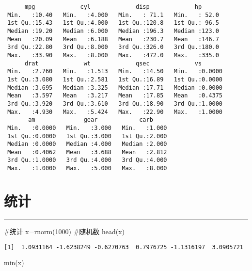 \documentclass[
  letterpaper,
  DIV=11,
  numbers=noendperiod]{scrreprt}
\newenvironment{Shaded}{\begin{snugshade}}{\end{snugshade}}
\newcommand{\CommentTok}[1]{\textcolor[rgb]{0.37,0.37,0.37}{#1}}
\newcommand{\DecValTok}[1]{\textcolor[rgb]{0.68,0.00,0.00}{#1}}
\newcommand{\FunctionTok}[1]{\textcolor[rgb]{0.28,0.35,0.67}{#1}}
\newcommand{\NormalTok}[1]{\textcolor[rgb]{0.00,0.23,0.31}{#1}}
\newcommand{\OtherTok}[1]{\textcolor[rgb]{0.00,0.23,0.31}{#1}}
\begin{document}
\begin{verbatim}
      mpg             cyl             disp             hp       
 Min.   :10.40   Min.   :4.000   Min.   : 71.1   Min.   : 52.0  
 1st Qu.:15.43   1st Qu.:4.000   1st Qu.:120.8   1st Qu.: 96.5  
 Median :19.20   Median :6.000   Median :196.3   Median :123.0  
 Mean   :20.09   Mean   :6.188   Mean   :230.7   Mean   :146.7  
 3rd Qu.:22.80   3rd Qu.:8.000   3rd Qu.:326.0   3rd Qu.:180.0  
 Max.   :33.90   Max.   :8.000   Max.   :472.0   Max.   :335.0  
      drat             wt             qsec             vs        
 Min.   :2.760   Min.   :1.513   Min.   :14.50   Min.   :0.0000  
 1st Qu.:3.080   1st Qu.:2.581   1st Qu.:16.89   1st Qu.:0.0000  
 Median :3.695   Median :3.325   Median :17.71   Median :0.0000  
 Mean   :3.597   Mean   :3.217   Mean   :17.85   Mean   :0.4375  
 3rd Qu.:3.920   3rd Qu.:3.610   3rd Qu.:18.90   3rd Qu.:1.0000  
 Max.   :4.930   Max.   :5.424   Max.   :22.90   Max.   :1.0000  
       am              gear            carb      
 Min.   :0.0000   Min.   :3.000   Min.   :1.000  
 1st Qu.:0.0000   1st Qu.:3.000   1st Qu.:2.000  
 Median :0.0000   Median :4.000   Median :2.000  
 Mean   :0.4062   Mean   :3.688   Mean   :2.812  
 3rd Qu.:1.0000   3rd Qu.:4.000   3rd Qu.:4.000  
 Max.   :1.0000   Max.   :5.000   Max.   :8.000  
\end{verbatim}

\section{统计}\label{ux7edfux8ba1}

\begin{center}\rule{0.5\linewidth}{0.5pt}\end{center}

\begin{Shaded}
\begin{Highlighting}[]
\CommentTok{\#统计}
\NormalTok{x}\OtherTok{=}\FunctionTok{rnorm}\NormalTok{(}\DecValTok{1000}\NormalTok{) }\CommentTok{\#随机数}
\FunctionTok{head}\NormalTok{(x)}
\end{Highlighting}
\end{Shaded}

\begin{verbatim}
[1]  1.0931164 -1.6238249 -0.6270763  0.7976725 -1.1316197  3.0905721
\end{verbatim}

\begin{Shaded}
\begin{Highlighting}[]
\FunctionTok{min}\NormalTok{(x)}
\end{Highlighting}
\end{Shaded}
\end{document}
